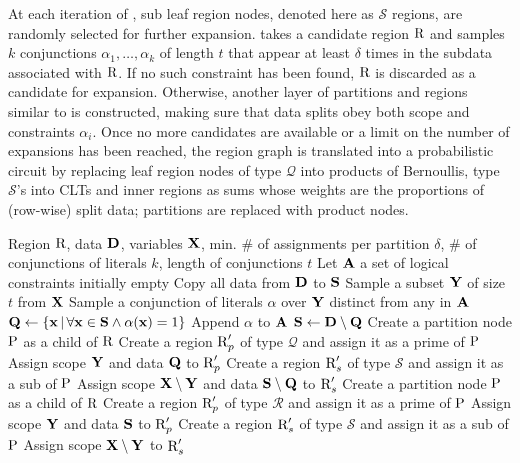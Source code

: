 At each iteration of , sub leaf region nodes, denoted here as $\mathcal{S}$ regions,
are randomly selected for further expansion.  takes a candidate region
$\operatorname{\textrm{R}}$ and samples $k$ conjunctions $\alpha_1,\ldots,\alpha_k$ of length $t$ that appear at
least $\delta$ times in the subdata associated with $\operatorname{\textrm{R}}$. If no such constraint has been
found, $\operatorname{\textrm{R}}$ is discarded as a candidate for expansion. Otherwise, another layer of partitions
and regions similar to  is constructed, making sure that data splits obey both scope
and constraints $\alpha_i$. Once no more candidates are available or a limit on the number of
expansions has been reached, the region graph is translated into a probabilistic circuit by
replacing leaf region nodes of type $\mathcal{Q}$ into products of Bernoullis, type $\mathcal{S}$'s
into CLTs and inner regions as sums whose weights are the proportions of (row-wise) split data;
partitions are replaced with product nodes.

\begin{algorithm}[t]
  \caption{}\label{alg:xpcs-expand}
  \begin{algorithmic}[1]
    \Require Region $\operatorname{\textrm{R}}$, data $\mathbf{D}$, variables $\mathbf{X}$, min. \# of assignments per
      partition $\delta$, \# of conjunctions of literals $k$, length of conjunctions $t$
    \State Let $\mathbf{A}$ a set of logical constraints initially empty
    \State Copy all data from $\mathbf{D}$ to $\mathbf{S}$
    \State Sample a subset $\mathbf{Y}$ of size $t$ from $\mathbf{X}$\label{alg:xpcs-expand:line:sample}
      \State Sample a conjunction of literals $\alpha$ over $\mathbf{Y}$ distinct from any in $\mathbf{A}$
      \State $\mathbf{Q}\gets\{\mathbf{x}\,|\,\forall\mathbf{x}\in\mathbf{S}\wedge\alpha(\mathbf{x})=1\}$
        \State Append $\alpha$ to $\mathbf{A}$
        \State $\mathbf{S}\gets\mathbf{D}\setminus\mathbf{Q}$
        \State Create a partition node $\operatorname{\textrm{P}}$ as a child of $\operatorname{\textrm{R}}$
        \State Create a region $\operatorname{\textrm{R}}_p'$ of type $\mathcal{Q}$ and assign it as a prime of
          $\operatorname{\textrm{P}}$
        \State Assign scope $\mathbf{Y}$ and data $\mathbf{Q}$ to $\operatorname{\textrm{R}}_p'$
        \State Create a region $\operatorname{\textrm{R}}_s'$ of type $\mathcal{S}$ and assign it as a sub of
          $\operatorname{\textrm{P}}$
        \State Assign scope $\mathbf{X}\setminus\mathbf{Y}$ and data $\mathbf{S}\setminus\mathbf{Q}$ to $\operatorname{\textrm{R}}_s'$
      \EndIf
    \EndWhile
    \NIElse
      \State Create a partition node $\operatorname{\textrm{P}}$ as a child of $\operatorname{\textrm{R}}$
      \State Create a region $\operatorname{\textrm{R}}_p'$ of type $\mathcal{R}$ and assign it as a prime of
        $\operatorname{\textrm{P}}$
      \State Assign scope $\mathbf{Y}$ and data $\mathbf{S}$ to $\operatorname{\textrm{R}}_p'$
      \State Create a region $\operatorname{\textrm{R}}_s'$ of type $\mathcal{S}$ and assign it as a sub of
        $\operatorname{\textrm{P}}$
      \State Assign scope $\mathbf{X}\setminus\mathbf{Y}$ to $\operatorname{\textrm{R}}_s'$
    \EndNIElse
  \end{algorithmic}
\end{algorithm}

